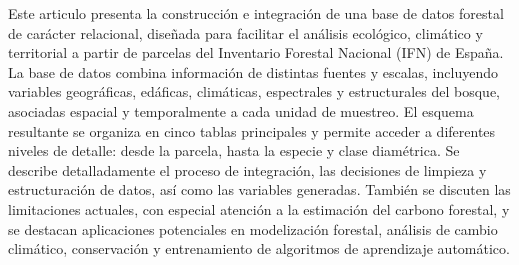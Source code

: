 

Este articulo presenta la construcción e integración de una base de datos forestal de carácter relacional, diseñada para facilitar el análisis ecológico, climático y territorial a partir de parcelas del Inventario Forestal Nacional (IFN) de España. La base de datos combina información de distintas fuentes y escalas, incluyendo variables geográficas, edáficas, climáticas, espectrales y estructurales del bosque, asociadas espacial y temporalmente a cada unidad de muestreo. El esquema resultante se organiza en cinco tablas principales y permite acceder a diferentes niveles de detalle: desde la parcela, hasta la especie y clase diamétrica. Se describe detalladamente el proceso de integración, las decisiones de limpieza y estructuración de datos, así como las variables generadas. También se discuten las limitaciones actuales, con especial atención a la estimación del carbono forestal, y se destacan aplicaciones potenciales en modelización forestal, análisis de cambio climático, conservación y entrenamiento de algoritmos de aprendizaje automático.


